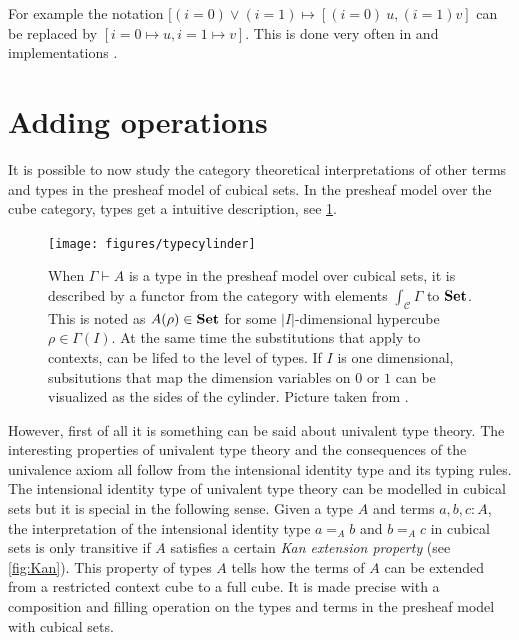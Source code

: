 \documentclass[12pt,a4paper,twoside,xetex]{book}
\newcommand{\keyword}[1]{\emph{#1}\index{#1}}
\begin{document}
For example the notation $[(i = 0) \vee (i=1) \mapsto [(i=0) \ u, (i=1) v]$ can 
be replaced by $[i=0 \mapsto u, i=1 \mapsto v]$. This is done very often in 
\cite{Huber2016} and implementations \cite{Moertberg2018}.

\section{Adding operations}\label{extraops}

It is possible to now study the category theoretical interpretations of other 
terms and types in the presheaf model of cubical sets. In the presheaf model 
over the cube category, types get a intuitive description, see \cref{hubtypes}. 

\begin{figure}\label{hubtypes}
 \centering
 
 \texttt{[image: figures/typecylinder]}
 
 \caption{When $\Gamma \vdash A$ is a type in the presheaf model over cubical 
sets, it is described by a functor from the category with elements 
$\int_{\mathcal{C}} \Gamma$ to $\text{\textbf{Set}}$. 
 This is noted as $A(\rho) \in \text{\textbf{Set}}$ for some $|I|$-dimensional hypercube $\rho 
\in \Gamma (I)$. At the same time the substitutions that apply to contexts, can 
be lifed to the level of types. If $I$ is one dimensional, subsitutions that 
map the dimension variables on $0$ or $1$ can be visualized as the sides of the 
cylinder. Picture taken from \cite{Huber2016def}.}
\end{figure}


However, first of all it is something can be said about univalent 
type theory. The interesting properties of univalent type theory and the 
consequences of the univalence axiom all follow from the intensional identity 
type and its typing rules. The intensional identity type of univalent type 
theory can be modelled in cubical sets but it is special in the following 
sense. Given a type $A$ and terms $a,b,c:A$, the interpretation of the 
intensional identity type $a =_A b$ and $b=_A c$  in cubical sets is only 
transitive if $A$ satisfies a certain \keyword{Kan extension property} (see 
\cref{fig:Kan}). This property of types $A$ tells how the terms of $A$ can be 
extended from a restricted context cube to a full cube. It is made precise with 
a composition and filling operation on the types and terms in the presheaf 
model with cubical sets.
\end{document}
